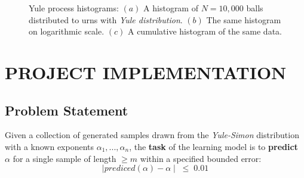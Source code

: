 \documentclass[a4paper, 12pt]{report}
\begin{document}
\begin{figure}[!ht]
\centering
    \hspace{0.5cm}
    \hspace{0.5cm}
    \label{fig:yule-process-histograms}
    \caption[]{
        Yule process histograms: 
        $(a)$ A histogram of $N=10,000$ balls distributed to urns with \textit{Yule distribution}.
        $(b)$ The same histogram on logarithmic scale.
        $(c)$ A cumulative histogram of the same data.
    }
\end{figure}

\chapter{PROJECT IMPLEMENTATION}

\section{Problem Statement}
Given a collection of generated samples drawn from the \textit{Yule-Simon} distribution with a known exponents $\alpha_1,...,\alpha_n$, the \textbf{task} of the learning model is to \textbf{predict $\alpha$} for a single sample of length $\geq m$ within a specified bounded error:
$$\mid prediced(\alpha) - \alpha \mid \; \leq \; 0.01$$
\end{document}
